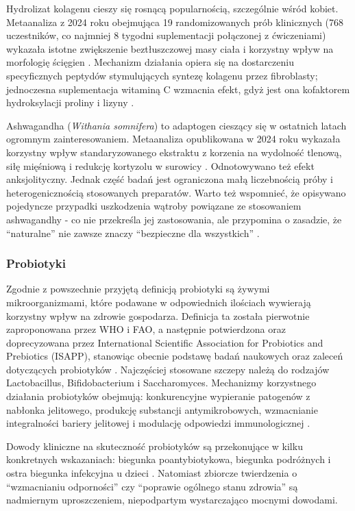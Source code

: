 Hydrolizat kolagenu cieszy się rosnącą popularnością, szczególnie wśród kobiet. Metaanaliza z 2024 roku obejmująca 19 randomizowanych prób klinicznych (768 uczestników, co najmniej 8 tygodni suplementacji połączonej z ćwiczeniami) wykazała istotne zwiększenie beztłuszczowej masy ciała i korzystny wpływ na morfologię ścięgien \cite{bischof2024impact}. Mechanizm działania opiera się na dostarczeniu specyficznych peptydów stymulujących syntezę kolagenu przez fibroblasty; jednoczesna suplementacja witaminą C wzmacnia efekt, gdyż jest ona kofaktorem hydroksylacji proliny i lizyny \cite{bischof2024impact}.

Ashwagandha (\textit{Withania somnifera}) to adaptogen cieszący się w ostatnich latach ogromnym zainteresowaniem. Metaanaliza opublikowana w 2024 roku wykazała korzystny wpływ standaryzowanego ekstraktu z korzenia na wydolność tlenową, siłę mięśniową i redukcję kortyzolu w surowicy \cite{ferreira2025biopsychological}. Odnotowywano też efekt anksjolityczny. Jednak część badań jest ograniczona małą liczebnością próby i heterogenicznością stosowanych preparatów. Warto też wspomnieć, że opisywano pojedyncze przypadki uszkodzenia wątroby powiązane ze stosowaniem ashwagandhy - co nie przekreśla jej zastosowania, ale przypomina o zasadzie, że \enquote{naturalne} nie zawsze znaczy \enquote{bezpieczne dla wszystkich} \cite{lin2023hidden}.


\subsubsection{Probiotyki}

Zgodnie z powszechnie przyjętą definicją probiotyki są żywymi mikroorganizmami, które podawane w odpowiednich ilościach wywierają korzystny wpływ na zdrowie gospodarza. Definicja ta została pierwotnie zaproponowana przez WHO i FAO, a następnie potwierdzona oraz doprecyzowana przez International Scientific Association for Probiotics and Prebiotics (ISAPP), stanowiąc obecnie podstawę badań naukowych oraz zaleceń dotyczących probiotyków \cite{hill2014expert}. Najczęściej stosowane szczepy należą do rodzajów Lactobacillus, Bifidobacterium i Saccharomyces. Mechanizmy korzystnego działania probiotyków obejmują: konkurencyjne wypieranie patogenów z nabłonka jelitowego, produkcję substancji antymikrobowych, wzmacnianie integralności bariery jelitowej i modulację odpowiedzi immunologicznej \cite{hill2014expert}.

Dowody kliniczne na skuteczność probiotyków są przekonujące w kilku konkretnych wskazaniach: biegunka poantybiotykowa, biegunka podróżnych i ostra biegunka infekcyjna u dzieci \cite{hill2014expert}. Natomiast zbiorcze twierdzenia o \enquote{wzmacnianiu odporności} czy \enquote{poprawie ogólnego stanu zdrowia} są nadmiernym uproszczeniem, niepodpartym wystarczająco mocnymi dowodami.

